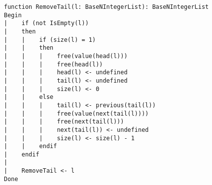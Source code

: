 \begin{lstlisting}[breaklines]
function RemoveTail(l: BaseNIntegerList): BaseNIntegerList
Begin
|    if (not IsEmpty(l))
|    then
|    |    if (size(l) = 1)
|    |    then
|    |    |    free(value(head(l)))
|    |    |    free(head(l))
|    |    |    head(l) <- undefined
|    |    |    tail(l) <- undefined
|    |    |    size(l) <- 0
|    |    else
|    |    |    tail(l) <- previous(tail(l))
|    |    |    free(value(next(tail(l))))
|    |    |    free(next(tail(l)))
|    |    |    next(tail(l)) <- undefined
|    |    |    size(l) <- size(l) - 1
|    |    endif
|    endif
|
|    RemoveTail <- l
Done
\end{lstlisting}
